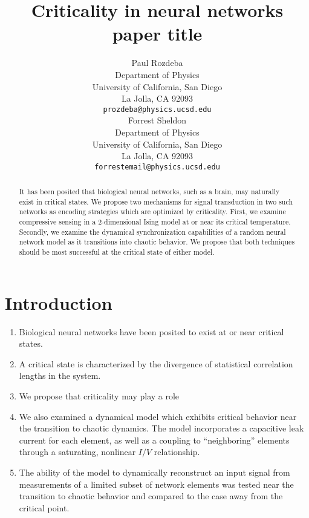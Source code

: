 \documentclass{article} %
\title{Criticality in neural networks paper title}
\author{
Paul Rozdeba%
\\
Department of Physics\\
University of California, San Diego\\
La Jolla, CA 92093 \\
\texttt{prozdeba@physics.ucsd.edu} \\
\And
Forrest Sheldon \\
Department of Physics\\
University of California, San Diego\\
La Jolla, CA 92093 \\
\texttt{forrestemail@physics.ucsd.edu} \\
}
\begin{document}
\maketitle

\begin{abstract}
It has been posited that biological neural networks, such as a brain, may naturally exist in critical states.  We propose two mechanisms for signal transduction in two such networks as encoding strategies which are optimized by criticality.  First, we examine compressive sensing in a 2-dimensional Ising model at or near its critical temperature.  Secondly, we examine the dynamical synchronization capabilities of a random neural network model as it transitions into chaotic behavior.  We propose that both techniques should be most successful at the critical state of either model.
\end{abstract}


\section{Introduction}
\begin{enumerate}
	\item Biological neural networks have been posited to exist at or near critical states.
	\item A critical state is characterized by the divergence of statistical correlation lengths in the system.
	\item We propose that criticality may play a role 
	\item We also examined a dynamical model which exhibits critical behavior near the transition to chaotic dynamics.  The model incorporates a capacitive leak current for each element, as well as a coupling to ``neighboring'' elements through a saturating, nonlinear $I/V$ relationship.
	\item The ability of the model to dynamically reconstruct an input signal from measurements of a limited subset of network elements was tested near the transition to chaotic behavior and compared to the case away from the critical point.
\end{enumerate}
\end{document}
